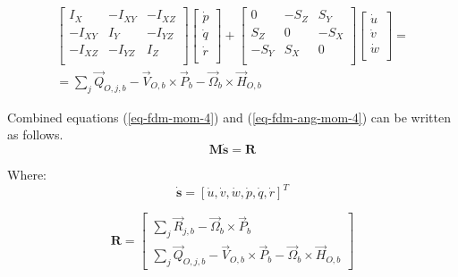 \begin{multline}
  \label{eq-fdm-ang-mom-4}
    \left[
      \begin{matrix}
        I_X    & -I_{XY} & -I_{XZ} \\
        -I_{XY} &  I_Y    & -I_{YZ} \\
        -I_{XZ} & -I_{YZ} &  I_Z    \\
      \end{matrix}
    \right]
    \left[
      \begin{matrix}
        \dot p \\
        \dot q \\
        \dot r \\
      \end{matrix}
    \right]
    +
    \left[
      \begin{matrix}
          0 & -S_Z &  S_Y \\
        S_Z &    0 & -S_X \\
        -S_Y &  S_X &    0 \\
      \end{matrix}
    \right]
    \left[
      \begin{matrix}
        \dot u \\
        \dot v \\
        \dot w \\
      \end{matrix}
    \right]
    = \\ =
    \sum_j {\vec Q}_{O,j,b}
    -
    {\vec V}_{O,b} \times {\vec P}_b
    -
    {\vec \Omega}_b \times {\vec H}_{O,b}
\end{multline}

Combined equations (\ref{eq-fdm-mom-4}) and (\ref{eq-fdm-ang-mom-4}) can be written as follows. \cite{Sibilski2004}
\begin{equation}
  \label{eq-fdm-motion-1}
  \boldsymbol M \dot {\boldsymbol s} = \boldsymbol R
\end{equation}

Where:
\begin{equation}
  \dot {\boldsymbol s}
  =
  \left[ \dot u, \dot v, \dot w, \dot p, \dot q, \dot r \right]^T
\end{equation}

\begin{equation}
  {\boldsymbol R}
  =
  \left[
    \begin{array}{c}
      \sum_{j} {\vec R}_{j,b} - {\vec \Omega}_b \times {\vec P}_b \\
      \sum_{j} {\vec Q}_{O,j,b} - {\vec V}_{O,b} \times {\vec P}_b - {\vec \Omega}_b \times {\vec H}_{O,b}
    \end{array}
  \right]
\end{equation}

